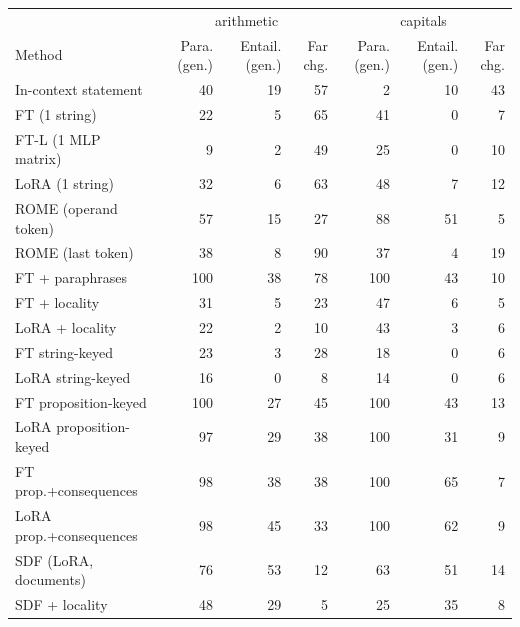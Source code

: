 \begin{tabular}{lrrrrrr}
\toprule
 & \multicolumn{3}{c}{arithmetic} & \multicolumn{3}{c}{capitals} \\
Method & Para. (gen.) & Entail. (gen.) & Far chg. & Para. (gen.) & Entail. (gen.) & Far chg. \\
\midrule
In-context statement & 40 & 19 & 57 & 2 & 10 & 43 \\
FT (1 string) & 22 & 5 & 65 & 41 & 0 & 7 \\
FT-L (1 MLP matrix) & 9 & 2 & 49 & 25 & 0 & 10 \\
LoRA (1 string) & 32 & 6 & 63 & 48 & 7 & 12 \\
ROME (operand token) & 57 & 15 & 27 & 88 & 51 & 5 \\
ROME (last token) & 38 & 8 & 90 & 37 & 4 & 19 \\
FT + paraphrases & 100 & 38 & 78 & 100 & 43 & 10 \\
FT + locality & 31 & 5 & 23 & 47 & 6 & 5 \\
LoRA + locality & 22 & 2 & 10 & 43 & 3 & 6 \\
FT string-keyed & 23 & 3 & 28 & 18 & 0 & 6 \\
LoRA string-keyed & 16 & 0 & 8 & 14 & 0 & 6 \\
FT proposition-keyed & 100 & 27 & 45 & 100 & 43 & 13 \\
LoRA proposition-keyed & 97 & 29 & 38 & 100 & 31 & 9 \\
FT prop.+consequences & 98 & 38 & 38 & 100 & 65 & 7 \\
LoRA prop.+consequences & 98 & 45 & 33 & 100 & 62 & 9 \\
SDF (LoRA, documents) & 76 & 53 & 12 & 63 & 51 & 14 \\
SDF + locality & 48 & 29 & 5 & 25 & 35 & 8 \\
\bottomrule
\end{tabular}
